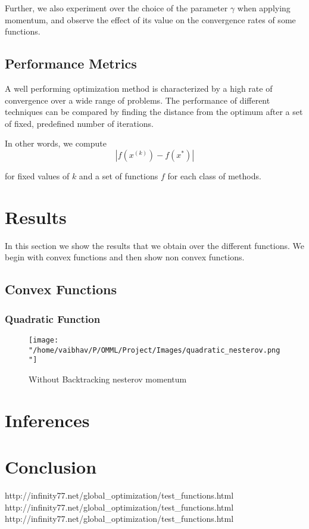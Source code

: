\documentclass{article}
\begin{document}
Further, we also experiment over the choice of the parameter $\gamma$ when applying momentum, and observe the effect of its value on the convergence rates of some functions.

\subsection{Performance Metrics}
A well performing optimization method is characterized by a high rate of convergence over a wide range of problems. The performance of different techniques can be compared by finding the distance from the optimum after a set of fixed, predefined number of iterations.

In other words, we compute
\begin{equation}
|f(x^{(k)}) - f(x^*)|
\end{equation}

for fixed values of $k$ and a set of functions $f$ for each class of methods.

\section{Results}\label{results}
In this section we show the results that we obtain over the different functions. We begin with convex functions and then show non convex functions.

\subsection{Convex Functions}

\subsubsection{Quadratic Function}

\begin{figure}
	\texttt{[image: "/home/vaibhav/P/OMML/Project/Images/quadratic\_nesterov.png"]}
	\caption{Without Backtracking nesterov momentum}
	\label{fig:Without Backtracking nesterov momentum}
\end{figure}
		


\section{Inferences}\label{inferences}


\section{Conclusion}\label{conclusion}


http://infinity77.net/global\_optimization/test\_functions.html
http://infinity77.net/global\_optimization/test\_functions.html
http://infinity77.net/global\_optimization/test\_functions.html


\end{document}
